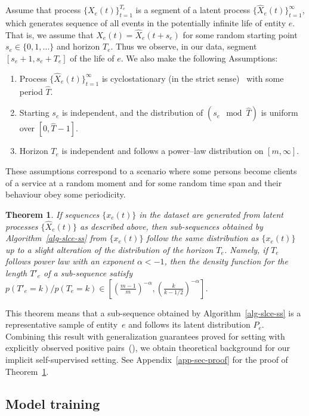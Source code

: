 \documentclass{article}
\newtheorem{thm}{Theorem}
\begin{document}
Assume that process $\{X_e(t)\}_{t=1}^{T_e}$ is a segment of a latent process $\{\widehat{X}_e(t)\}_{t=1}^{\infty}$, which generates sequence of all events in the potentially infinite life of entity $e$. That is, we assume that $X_e(t)=\widehat{X}_e(t+s_e)$ for some random starting point $s_e\in \{0,1,\ldots\}$ and horizon $T_e$. Thus we observe, in our data, segment $[s_e+1,s_e+T_e]$ of the life of $e$. We also make the following Assumptions:
\begin{enumerate}
    \item Process $\{\widehat{X}_e(t)\}_{t=1}^{\infty}$ is cyclostationary (in the strict sense)~\citep{Gardner2006Cyclostationarity} with some period $\widehat{T}$.
    \item Starting $s_e$ is independent, and the distribution of $(s_e \mod \widehat{T})$ is uniform over $[0,\widehat{T}-1]$.
    \item Horizon $T_e$ is independent and follows a power--law distribution on $[m,\infty]$.
\end{enumerate}
These assumptions correspond to a scenario where some persons become clients of a service at a random moment and for some random time span and their behaviour obey some periodicity.    %
\begin{thm}\label{thm:distribution}
If sequences $\{x_e(t)\}$ in the dataset are generated from latent processes $\{\widehat{X}_e(t)\}$ as described above, then sub-sequences obtained by Algorithm~\ref{alg-slce-ss} from $\{x_e(t)\}$ follow the same distribution as $\{x_e(t)\}$ up to a slight alteration of the distribution of the horizon $T_e$. Namely, if $T_e$ follows power law with an exponent $\alpha <-1$, then the density function for the length $T'_e$ of a sub-sequence satisfy $p(T'_e=k)/p(T_e=k)\in [(\frac{m-1}{m})^{-\alpha},(\frac{k}{k-1/2})^{-\alpha}]$.
\end{thm}
This theorem means that a sub-sequence obtained by Algorithm~\ref{alg-slce-ss} is a representative sample of entity~$e$ and follows its latent distribution $P_e$. Combining this result with generalization guarantees proved for setting with explicitly observed positive pairs~(\cite{Saunshi2019ICML}), we obtain theoretical background for our implicit self-supervised setting.   
See Appendix~\ref{app-sec-proof} for the proof of Theorem~\ref{thm:distribution}.

\subsection{Model training} \label{sec-training}
\end{document}
